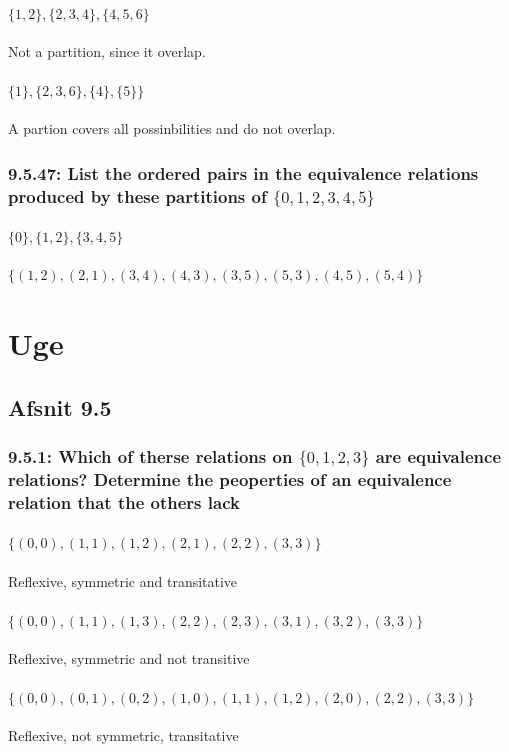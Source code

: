 \documentclass[12pt, a4paper]{report}
\begin{document}
					\subsubsection{$\{1,2\},\{2,3,4\},\{4,5,6\}$}
						Not a partition, since it overlap.	
					\subsubsection{$\{1\},\{2,3,6\},\{4\},\{5\}\}$}
						A partion covers all possinbilities and do not overlap.						
				\setcounter{subsection}{46}
				\subsection{9.5.47: List the ordered pairs in the equivalence relations produced by these partitions of $\{0,1,2,3,4,5\}$}
					\subsubsection{$\{0\},\{1,2\},\{3,4,5\}$}
					  $\{(1,2),(2,1),(3,4),(4,3),(3,5),(5,3),(4,5),(5,4)\}$
				
		\setcounter{chapter}{42}
		\chapter{Uge}
			\section{Afsnit 9.5}
				\subsection{9.5.1: Which of therse relations on $\{0,1,2,3\}$ are equivalence relations? Determine the peoperties of an equivalence relation that the others lack}
					\setcounter{subsubsection}{2}
					\subsubsection{$\{(0, 0), (1, 1), (1, 2), (2, 1), (2, 2), (3, 3)\}$}
						Reflexive, symmetric and transitative
					\subsubsection{$\{(0, 0), (1, 1), (1, 3), (2, 2), (2, 3), (3, 1), (3, 2), (3, 3)\}$}
						Reflexive, symmetric and not transitive
					\subsubsection{$\{(0, 0), (0, 1), (0, 2), (1, 0), (1, 1), (1, 2), (2, 0),(2, 2), (3, 3)\}$}
						Reflexive, not symmetric, transitative
				\setcounter{subsection}{25}
\end{document}
